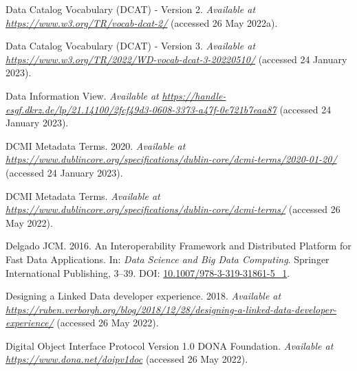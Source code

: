\begin{CSLReferences}{1}{0}
\leavevmode{}%
Data Catalog Vocabulary (DCAT) - Version 2. \emph{Available at} \href{https://www.w3.org/TR/vocab-dcat-2/}{\emph{https://www.w3.org/TR/vocab-dcat-2/}} (accessed 26 May 2022a).

\leavevmode{}%
Data Catalog Vocabulary (DCAT) - Version 3. \emph{Available at} \href{https://www.w3.org/TR/2022/WD-vocab-dcat-3-20220510/}{\emph{https://www.w3.org/TR/2022/WD-vocab-dcat-3-20220510/}} (accessed 24 January 2023).

\leavevmode{}%
Data Information View. \emph{Available at} \href{https://handle-esgf.dkrz.de/lp/21.14100/2fcf49d3-0608-3373-a47f-0e721b7eaa87}{\emph{https://handle-esgf.dkrz.de/lp/21.14100/2fcf49d3-0608-3373-a47f-0e721b7eaa87}} (accessed 24 January 2023).

\leavevmode{}%
DCMI Metadata Terms. 2020. \emph{Available at} \href{https://www.dublincore.org/specifications/dublin-core/dcmi-terms/2020-01-20/}{\emph{https://www.dublincore.org/specifications/dublin-core/dcmi-terms/2020-01-20/}} (accessed 24 January 2023).

\leavevmode{}%
DCMI Metadata Terms. \emph{Available at} \href{https://www.dublincore.org/specifications/dublin-core/dcmi-terms/}{\emph{https://www.dublincore.org/specifications/dublin-core/dcmi-terms/}} (accessed 26 May 2022).

\leavevmode{}%
Delgado JCM. 2016. An Interoperability Framework and Distributed Platform for Fast Data Applications. In: \emph{Data Science and Big Data Computing}. Springer International Publishing, 3--39. DOI: \href{https://doi.org/10.1007/978-3-319-31861-5_1}{10.1007/978-3-319-31861-5\_1}.

\leavevmode{}%
Designing a Linked Data developer experience. 2018. \emph{Available at} \href{https://ruben.verborgh.org/blog/2018/12/28/designing-a-linked-data-developer-experience/}{\emph{https://ruben.verborgh.org/blog/2018/12/28/designing-a-linked-data-developer-experience/}} (accessed 26 May 2022).

\leavevmode{}%
Digital Object Interface Protocol Version 1.0 \textbar{} DONA Foundation. \emph{Available at} \href{https://www.dona.net/doipv1doc}{\emph{https://www.dona.net/doipv1doc}} (accessed 26 May 2022).


\end{CSLReferences}
